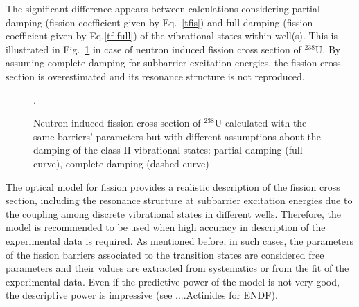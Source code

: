 \documentclass[twocolumn,amsmath,amssymb,10pt,groupedaddress,letter]{revtex4}
\begin{document}
 The significant difference appears between calculations considering partial damping (fission
coefficient given by Eq.~\ref{tfis}) and full damping (fission coefficient given by
Eq.\ref{tf-full}) of the vibrational states within well(s).
This is illustrated in Fig.~\ref{fis-u38-fcom} in case of neutron induced
fission cross section of $^{238}$U. By assuming complete damping for
subbarrier excitation energies, the fission cross section is overestimated and its
resonance structure is not reproduced.
%
\begin{figure}[htbp]
\caption{\label{fis-u38-fcom}Neutron induced fission cross section of $^{238}$U calculated with the same
barriers' parameters but with different assumptions about the damping of the class II
vibrational states: partial damping (full curve), complete damping (dashed curve)}.
\end{figure}
%


The optical model for fission provides a realistic description of the fission
cross section, including the resonance structure at subbarrier excitation energies due to the
coupling among discrete vibrational states in different wells. Therefore, the model is recommended to
be used when high accuracy in description of the experimental data is required.
As mentioned before, in such cases,
the parameters of the fission barriers associated to the transition states are considered free
parameters and their values are extracted from systematics or from the fit of the experimental
data. Even if the predictive power of the model is not very good, the descriptive power is
impressive (see ....Actinides for ENDF).

\medskip
\end{document}

